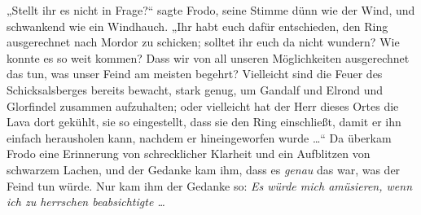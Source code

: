 „Stellt ihr es nicht in Frage?“ sagte Frodo, seine Stimme dünn wie der Wind, und schwankend wie ein Windhauch.
„Ihr habt euch dafür entschieden, den Ring ausgerechnet nach Mordor zu schicken; solltet ihr euch da nicht wundern? Wie konnte es so weit kommen? Dass wir von all unseren Möglichkeiten ausgerechnet das tun, was unser Feind am meisten begehrt? Vielleicht sind die Feuer des Schicksalsberges bereits bewacht, stark genug, um Gandalf und Elrond und Glorfindel zusammen aufzuhalten; oder vielleicht hat der Herr dieses Ortes die Lava dort gekühlt, sie so eingestellt, dass sie den Ring einschließt, damit er ihn einfach herausholen kann, nachdem er hineingeworfen wurde …“ Da überkam Frodo eine Erinnerung von schrecklicher Klarheit und ein Aufblitzen von schwarzem Lachen, und der Gedanke kam ihm, dass es \emph{genau} das war, was der Feind tun würde. Nur kam ihm der Gedanke so: \emph{Es würde mich amüsieren, wenn ich zu herrschen beabsichtigte …}

